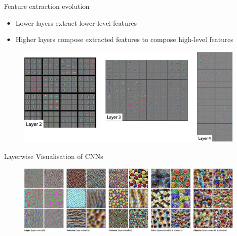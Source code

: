 \documentclass[11pt,compress,t,notes=noshow, aspectratio=169, xcolor=table]{beamer}
\begin{document}
	
\begin{frame}{Feature extraction evolution}
    \begin{itemize}
        \item Lower layers extract lower-level features
        \item Higher layers compose extracted features to compose high-level features
    \end{itemize}
    \begin{figure}[h]
         \includegraphics[scale=.4]{bild7}
    \end{figure}
\end{frame}
	
	
\begin{frame}{Layerwise Visualisation of CNNs}
    \begin{figure}
        \centering
        \includegraphics[scale=.38]{bild8}
    \end{figure}
\end{frame}
	
\end{document}
